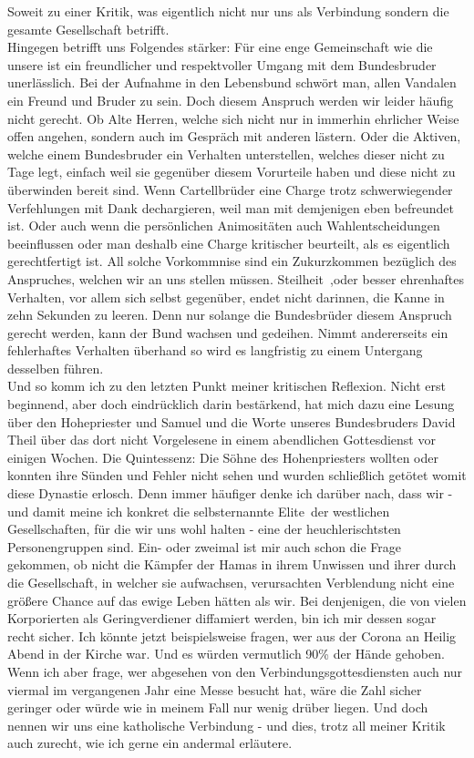 \begin{multicols}{2}
Soweit zu einer Kritik, was eigentlich nicht nur uns als Verbindung sondern die gesamte Gesellschaft betrifft.
\\
Hingegen betrifft uns Folgendes stärker:
Für eine enge Gemeinschaft wie die unsere ist ein freundlicher und respektvoller Umgang mit dem Bundesbruder unerlässlich. Bei der Aufnahme in den Lebensbund schwört man, allen Vandalen ein Freund und Bruder zu sein. Doch diesem Anspruch werden wir leider häufig nicht gerecht. Ob Alte Herren, welche sich nicht nur in immerhin ehrlicher Weise offen angehen, sondern auch im Gespräch mit anderen lästern. Oder die Aktiven, welche einem Bundesbruder ein Verhalten unterstellen, welches dieser nicht zu Tage legt, einfach weil sie gegenüber diesem Vorurteile haben und diese nicht zu überwinden bereit sind. Wenn Cartellbrüder eine Charge trotz schwerwiegender Verfehlungen mit Dank dechargieren, weil man mit demjenigen eben befreundet ist. Oder auch wenn die persönlichen Animositäten auch Wahlentscheidungen beeinflussen oder man deshalb eine Charge kritischer beurteilt, als es eigentlich gerechtfertigt ist.
All solche Vorkommnise sind ein Zukurzkommen bezüglich des Anspruches, welchen wir an uns stellen müssen. \glqq Steilheit\grqq ~,oder besser ehrenhaftes Verhalten, vor allem sich selbst gegenüber, endet nicht darinnen, die Kanne in zehn Sekunden zu leeren.
Denn nur solange die Bundesbrüder diesem Anspruch gerecht werden, kann der Bund wachsen und gedeihen. Nimmt andererseits ein fehlerhaftes Verhalten überhand so wird es langfristig zu einem Untergang desselben führen.
\\
Und so komm ich zu den letzten Punkt meiner kritischen Reflexion. Nicht erst beginnend, aber doch eindrücklich darin bestärkend, hat mich dazu eine Lesung über den Hohepriester und Samuel und die Worte unseres Bundesbruders David Theil über das dort nicht Vorgelesene in einem abendlichen Gottesdienst vor einigen Wochen. Die Quintessenz: Die Söhne des Hohenpriesters wollten oder konnten ihre Sünden und Fehler nicht sehen und wurden schließlich getötet womit diese Dynastie erlosch.
Denn immer häufiger denke ich darüber nach, dass wir - und damit meine ich konkret die selbsternannte \glqq Elite\grqq ~der westlichen Gesellschaften, für die wir uns wohl halten - eine der heuchlerischtsten Personengruppen sind. Ein- oder zweimal ist mir auch schon die Frage gekommen, ob nicht die Kämpfer der Hamas in ihrem Unwissen und ihrer durch die Gesellschaft, in welcher sie aufwachsen, verursachten Verblendung nicht eine größere Chance auf das ewige Leben hätten als wir. Bei denjenigen, die von vielen Korporierten als Geringverdiener diffamiert werden, bin ich mir dessen sogar recht sicher. Ich könnte jetzt beispielsweise fragen, wer aus der Corona an Heilig Abend in der Kirche war. Und es würden vermutlich 90\% der Hände gehoben. Wenn ich aber frage, wer abgesehen von den Verbindungsgottesdiensten auch nur viermal im vergangenen Jahr eine Messe besucht hat, wäre die Zahl sicher geringer oder würde wie in meinem Fall nur wenig drüber liegen. Und doch nennen wir uns eine katholische Verbindung - und dies, trotz all meiner Kritik auch zurecht, wie ich gerne ein andermal erläutere.

\end{multicols}
